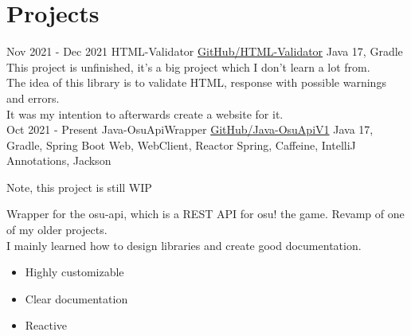 \documentclass[letterpaper]{twentysecondcv} %
\begin{document}
    \section{Projects}
    \begin{twenty} %
        \twentyitem
        {Nov 2021 -}
        {Dec 2021}
        {HTML-Validator}
        {\href{https://github.com/Tais993/HTML-Validator/}{GitHub/HTML-Validator}}
        {Java 17, Gradle}
        {
            This project is unfinished, it's a big project which I don't learn a lot from.\\

        The idea of this library is to validate HTML, response with possible warnings and errors.\\
        It was my intention to afterwards create a website for it.}\\

        \twentyitem
        {Oct 2021 -}
        {Present}
        {Java-OsuApiWrapper}
        {\href{https://github.com/Tais993/Java-OsuApiV1/}{GitHub/Java-OsuApiV1}}
        {Java 17, Gradle, Spring Boot Web, WebClient, Reactor Spring, Caffeine, IntelliJ Annotations, Jackson}
        {
            Note, this project is still WIP

        Wrapper for the osu-api, which is a REST API for osu! the game.
        Revamp of one of my older projects.\\

        I mainly learned how to design libraries and create good documentation.
            \begin{itemize}
                \item Highly customizable
                \item Clear documentation
                \item Reactive
            \end{itemize}}
    \end{twenty}

    \newpage

    \makesidebarSecond %

\end{document}
